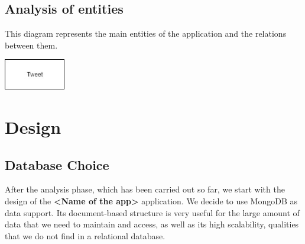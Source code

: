 \documentclass[a4paper, oneside]{article}
\begin{document}
\clearpage


\subsection{Analysis of entities}
This diagram represents the main entities of the application and the relations between them.
\begin{minipage}{\linewidth}
\begin{center}
\vspace{4mm}
\includegraphics[width = 0.2\textwidth]{./images/diagrams/Uml Analysis diagram} 
\vspace{2mm}
\label{fig:useCases}
\end{center}
\end{minipage}



\clearpage
\section{Design}

\subsection{Database Choice}
After the analysis phase, which has been carried out so far, we start with the design of the \textbf{<Name of the app>} application. We decide to use MongoDB as data support. Its document-based structure is very useful for the large amount of data that we need to maintain and access, as well as its high scalability, qualities that we do not find in a relational database.
\end{document}

